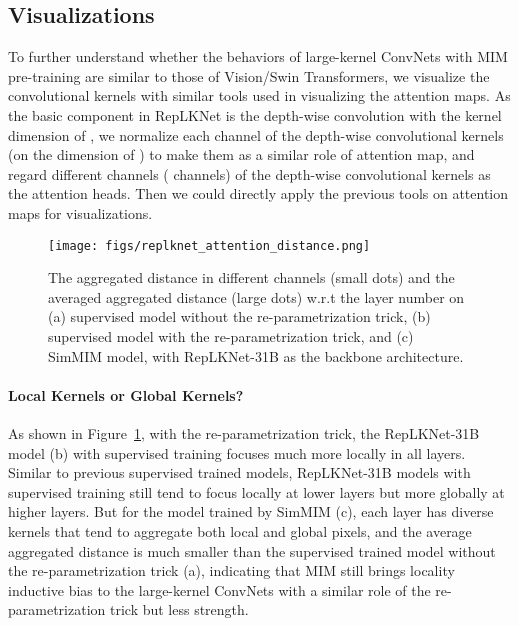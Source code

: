 \documentclass{article}
\begin{document}
\subsection{Visualizations} 

To further understand whether the behaviors of large-kernel ConvNets with MIM pre-training are similar to those of Vision/Swin Transformers, we visualize the convolutional kernels with similar tools used in visualizing the attention maps. As the basic component in RepLKNet is the depth-wise convolution with the kernel dimension of , we normalize each channel of the depth-wise convolutional kernels (on the dimension of ) to make them as a similar role of attention map, and regard different channels ( channels) of the depth-wise convolutional kernels as the attention heads. Then we could directly apply the previous tools on attention maps for visualizations.

\begin{figure}[h]
    \centering
    \texttt{[image: figs/replknet\_attention\_distance.png]}
    \caption{The aggregated distance in different channels (small dots) and the averaged aggregated distance (large dots) w.r.t the layer number on (a) supervised model without the re-parametrization trick, (b) supervised model with the re-parametrization trick, and (c) SimMIM model, with RepLKNet-31B as the backbone architecture.}
    \label{fig:replknet_attention_distance}
\end{figure}


\paragraph{Local Kernels or Global Kernels?}

As shown in  Figure~\ref{fig:replknet_attention_distance}, with the re-parametrization trick, the RepLKNet-31B model (b) with supervised training focuses much more locally in all layers. Similar to previous supervised trained models, RepLKNet-31B models with supervised training still tend to focus locally at lower layers but more globally at higher layers. But for the model trained by SimMIM (c), each layer has diverse kernels that tend to aggregate both local and global pixels, and the average aggregated distance is much smaller than the supervised trained model without the re-parametrization trick (a), indicating that MIM still brings locality inductive bias to the large-kernel ConvNets with a similar role of the re-parametrization trick but less strength.
\end{document}
